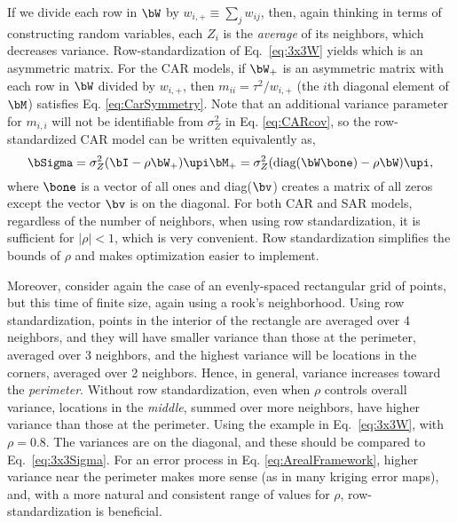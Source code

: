 If we divide each row in $\bW$ by $w_{i,+} \equiv \sum_j w_{ij}$, then, again thinking in terms of constructing random variables, each $Z_i$ is the \textit{average} of its neighbors, which decreases variance. Row-standardization of Eq.~\ref{eq:3x3W} yields
which is an asymmetric matrix. For the CAR models, if $\bW_+$ is an asymmetric matrix with each row in $\bW$ divided by $w_{i,+}$, then $m_{ii} = \tau^2/w_{i,+}$ (the $i$th diagonal element of $\bM$) satisfies Eq. \ref{eq:CarSymmetry}. Note that an additional variance parameter for $m_{i,i}$ will not be identifiable from $\sigma_Z^2$ in Eq. \ref{eq:CARcov}, so the row-standardized CAR model can be written equivalently as,
\begin{equation}\label{eq:bWone}
  \bSigma = \sigma_Z^2(\bI - \rho\bW_+)\upi\bM_+= \sigma_Z^2(\textrm{diag}(\bW\bone) - \rho\bW)\upi,
\end{equation}
where $\bone$ is a vector of all ones and diag($\bv$) creates a matrix of all zeros except the vector $\bv$ is on the diagonal. For both CAR and SAR models, regardless of the number of neighbors, when using row standardization, it is sufficient for $|\rho| < 1$, which is very convenient. Row standardization simplifies the bounds of $\rho$ and makes optimization easier to implement.  

Moreover, consider again the case of an evenly-spaced rectangular grid of points, but this time of finite size, again using a rook's neighborhood.  Using row standardization, points in the interior of the rectangle are averaged over 4 neighbors, and they will have smaller variance than those at the perimeter, averaged over 3 neighbors, and the highest variance will be locations in the corners, averaged over 2 neighbors.  Hence, in general, variance increases toward the \textit{perimeter}.  Without row standardization, even when $\rho$ controls overall variance, locations in the \textit{middle}, summed over more neighbors, have higher variance than those at the perimeter.  Using the example in Eq.~\ref{eq:3x3W},
with $\rho = 0.8$. The variances are on the diagonal, and these should be compared to Eq.~\ref{eq:3x3Sigma}. For an error process in Eq. \ref{eq:ArealFramework}, higher variance near the perimeter makes more sense (as in many kriging error maps), and, with a more natural and consistent range of values for $\rho$, row-standardization is beneficial. 

